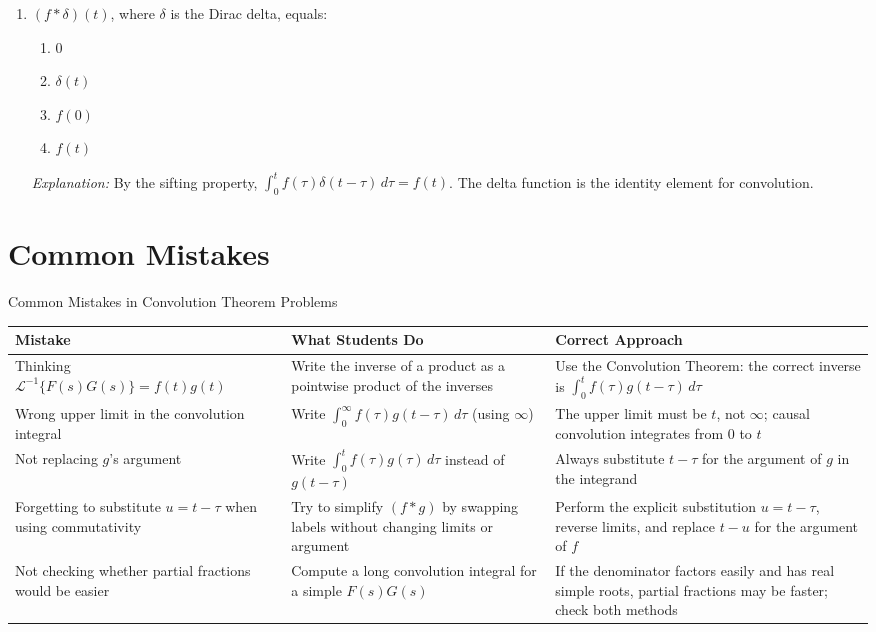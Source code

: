 \documentclass[12pt,a4paper]{article}
\begin{document}
\begin{enumerate}[label=\textbf{MCQ \arabic*.}, leftmargin=*, itemsep=14pt]
\item $(f * \delta)(t)$, where $\delta$ is the Dirac delta, equals:
\begin{enumerate}[label=(\alph*)]
\item $0$
\item $\delta(t)$
\item $f(0)$
\item \textbf{$f(t)$}
\end{enumerate}
\textit{Explanation:} By the sifting property,
$\int_0^t f(\tau)\delta(t-\tau)\,d\tau = f(t)$.
The delta function is the identity element for convolution.

\end{enumerate}

\section{Common Mistakes}

\begin{mistakebox}{Common Mistakes in Convolution Theorem Problems}
\begin{tabular}{@{}>{\raggedright\arraybackslash}p{4cm}
                 >{\raggedright\arraybackslash}p{4.5cm}
                 >{\raggedright\arraybackslash}p{5cm}@{}}
\toprule
\textbf{Mistake} & \textbf{What Students Do} & \textbf{Correct Approach} \\
\midrule
Thinking $\mathcal{L}^{-1}\{F(s)G(s)\} = f(t)g(t)$ &
Write the inverse of a product as a pointwise product of the inverses &
Use the Convolution Theorem: the correct inverse is $\int_0^t f(\tau)g(t-\tau)\,d\tau$ \\
\midrule
Wrong upper limit in the convolution integral &
Write $\int_0^\infty f(\tau)g(t-\tau)\,d\tau$ (using $\infty$) &
The upper limit must be $t$, not $\infty$; causal convolution integrates from $0$ to $t$ \\
\midrule
Not replacing $g$'s argument &
Write $\int_0^t f(\tau)g(\tau)\,d\tau$ instead of $g(t-\tau)$ &
Always substitute $t-\tau$ for the argument of $g$ in the integrand \\
\midrule
Forgetting to substitute $u = t-\tau$ when using commutativity &
Try to simplify $(f*g)$ by swapping labels without changing limits or argument &
Perform the explicit substitution $u = t-\tau$, reverse limits, and replace $t-u$ for the argument of $f$ \\
\midrule
Not checking whether partial fractions would be easier &
Compute a long convolution integral for a simple $F(s)G(s)$ &
If the denominator factors easily and has real simple roots, partial fractions may be faster; check both methods \\
\bottomrule
\end{tabular}
\end{mistakebox}
\end{document}

